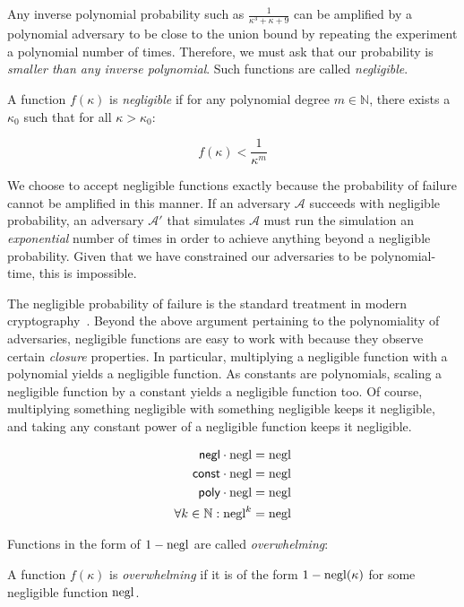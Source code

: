 Any inverse polynomial probability such as $\frac{1}{\kappa^3 + \kappa + 9}$ can be amplified by a
polynomial adversary to be close to the union bound by repeating the experiment a polynomial
number of times. Therefore, we must ask that our probability is \emph{smaller than any inverse
polynomial}. Such functions are called \emph{negligible}.

\begin{definition}
  A function $f(\kappa)$ is \emph{negligible} if for any polynomial degree
  $m \in \mathbb{N}$, there exists a $\kappa_0$ such that for all
  $\kappa > \kappa_0$:

  \[
    f(\kappa) < \frac{1}{\kappa^m}
  \]
\end{definition}

We choose to accept negligible functions exactly because the probability of failure
cannot be amplified in this manner. If an adversary $\mathcal{A}$ succeeds with negligible
probability, an adversary $\mathcal{A}'$ that simulates $\mathcal{A}$ must run the
simulation an \emph{exponential} number of times in order to achieve anything beyond
a negligible probability. Given that we have constrained our adversaries to be polynomial-time,
this is impossible.

The negligible probability of failure is the standard treatment in modern cryptography~\cite{katz}.
Beyond the above argument pertaining to the polynomiality of adversaries, negligible
functions are easy to work with because they observe certain \emph{closure} properties.
In particular, multiplying a negligible function with a polynomial yields a negligible
function. As constants are polynomials, scaling a negligible function by a constant
yields a negligible function too. Of course, multiplying something negligible with
something negligible keeps it negligible, and taking any constant power of a negligible function
keeps it negligible.

\begin{align*}
  \textsf{negl} \cdot \mathrm{negl} &= \mathrm{negl}\\
  \textsf{const} \cdot \mathrm{negl} &= \mathrm{negl}\\
  \textsf{poly} \cdot \mathrm{negl} &= \mathrm{negl}\\
  \forall k \in \mathbb{N}: \mathrm{negl}^k &= \mathrm{negl}
\end{align*}

Functions in the form of $1 - \mathrm{negl}$ are called \emph{overwhelming}:

\begin{definition}
  A function $f(\kappa)$ is \emph{overwhelming} if it is of the form
  $1 - \mathrm{negl}(\kappa)$ for some negligible function $\mathrm{negl}$.
\end{definition}

